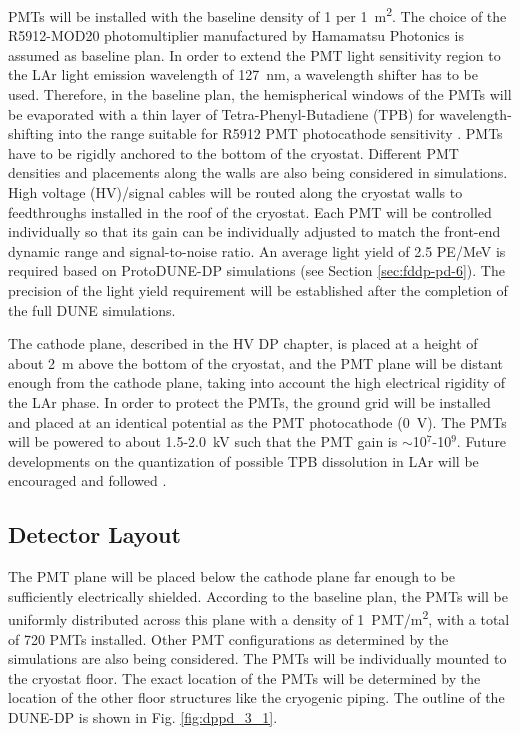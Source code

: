 PMTs will be installed with the baseline density of \num{1} per \SI{1}{m^2}. The choice of the R5912-MOD20 photomultiplier manufactured by Hamamatsu Photonics \cite{hamamatsu-5912} is assumed as baseline plan. In order to extend the PMT light sensitivity region to the LAr light emission wavelength of \SI{127}{nm}, a wavelength shifter has to be used. Therefore, in the baseline plan, the hemispherical windows of the PMTs will be evaporated with a thin layer of Tetra-Phenyl-Butadiene (TPB) \cite{tpb} for wavelength-shifting into the range suitable for R5912 PMT photocathode sensitivity \cite{hamamatsu-5912}. PMTs have to be rigidly anchored to the bottom of the cryostat. Different PMT densities and placements along the walls are also being considered in simulations. High voltage (HV)/signal cables will be routed along the cryostat walls to feedthroughs installed in the roof of the cryostat. Each PMT will be controlled individually so that its gain can be individually adjusted to match the front-end dynamic range and signal-to-noise ratio. An average light yield of 2.5 PE/MeV is required based on ProtoDUNE-DP simulations (see Section \ref{sec:fddp-pd-6}). The precision of the light yield requirement will be established after the completion of the full DUNE simulations.

The cathode plane, described in the HV DP chapter,  is placed at a height of about \SI{2}{m} above the bottom of the cryostat, and the PMT plane will be distant enough from the cathode plane, taking into account the high electrical rigidity of the LAr phase. In order to protect the PMTs, the ground grid will be installed and placed at an identical potential as the PMT photocathode (\SI{0}{V}). The PMTs will be powered to about \num{1.5}-\SI{2.0}{kV} such that the PMT gain is $\sim$\num{10}$^7$-\num{10}$^9$. Future developments on the quantization of possible TPB dissolution in LAr will be encouraged and followed \cite{TPBdiss}.

\subsection{Detector Layout}
\label{sec:fddp-pd-1.4}

The PMT plane will be placed below the cathode plane far enough to be sufficiently electrically shielded. According to the baseline plan, the PMTs will be uniformly distributed across this plane with a density of \SI{1}{PMT/m^2}, with a total of \num{720} PMTs installed. Other PMT configurations as determined by the simulations are also being considered. The PMTs will be individually mounted to the cryostat floor. The exact location of the PMTs will be determined by the location of the other floor structures like the cryogenic piping. The outline of the DUNE-DP is shown in Fig. \ref{fig:dppd_3_1}.

